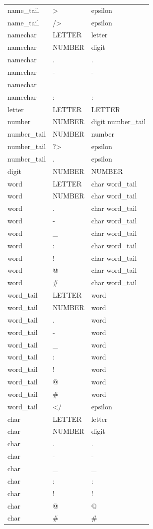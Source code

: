 \documentclass[12pt,a4paper]{article}
\begin{document}
\begin{longtable}{>{\ttfamily}p{}>{\ttfamily}p{}>{\ttfamily}p{}}
name\_tail & > & epsilon \\
name\_tail & /> & epsilon \\
namechar & LETTER & letter \\
namechar & NUMBER & digit \\
namechar & . & . \\
namechar & - & - \\
namechar & \_ & \_ \\
namechar & : & : \\
letter & LETTER & LETTER \\
number & NUMBER & digit number\_tail \\
number\_tail & NUMBER & number \\
number\_tail & ?> & epsilon \\
number\_tail & . & epsilon \\
digit & NUMBER & NUMBER \\
word & LETTER & char word\_tail \\
word & NUMBER & char word\_tail \\
word & . & char word\_tail \\
word & - & char word\_tail \\
word & \_ & char word\_tail \\
word & : & char word\_tail \\
word & ! & char word\_tail \\
word & @ & char word\_tail \\
word & \# & char word\_tail \\
word\_tail & LETTER & word \\
word\_tail & NUMBER & word \\
word\_tail & . & word \\
word\_tail & - & word \\
word\_tail & \_ & word \\
word\_tail & : & word \\
word\_tail & ! & word \\
word\_tail & @ & word \\
word\_tail & \# & word \\
word\_tail & </ & epsilon \\
char & LETTER & letter \\
char & NUMBER & digit \\
char & . & . \\
char & - & - \\
char & \_ & \_ \\
char & : & : \\
char & ! & ! \\
char & @ & @ \\
char & \# & \# \\
\bottomrule
\end{longtable}
\end{document}
